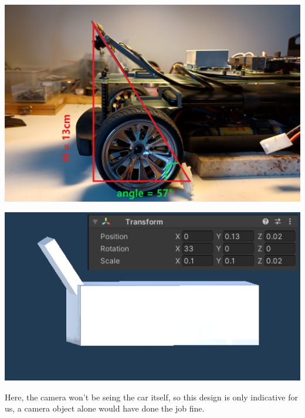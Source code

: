 \documentclass[12pt]{article}
\begin{document}
\centerline{\includegraphics[width=15cm]{../../docs/camera.png}} 
\centerline{\includegraphics[width=15cm]{../../docs/car-sim.png}} 
Here, the camera won't be seing the car itself, so this design is only indicative for us, a camera object alone would have done the job fine.
\end{document}
